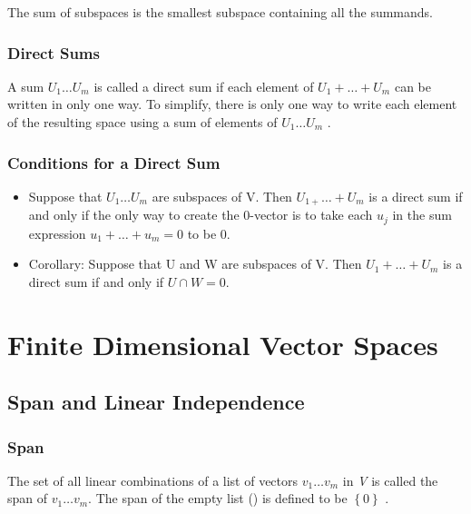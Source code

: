 \documentclass{article}
\begin{document}
The sum of subspaces is the smallest subspace containing all the summands.


\subsubsection{Direct Sums}


A sum \( U_{1} \ldots U_{m}     \) is called a direct sum if each element of \( U_{1} + \ldots + U_{m}     \) can be written in only one way. To simplify, there is only one way to write each element of the resulting space using a sum of elements of \( U_{1} \ldots U_{m}     \) .


\subsubsection{Conditions for a Direct Sum}


\begin{itemize}

\item Suppose that \( U_{1} \ldots U_{m}     \) are subspaces of V. Then \( U_{1 +} \ldots + U_{m}     \) is  a direct sum if and only if the only way to create the 0-vector is to take each \( u_{j} \) in the sum expression \( u_{1} + \ldots + u_{m} = 0   \) to be 0.


\item Corollary: Suppose that U and W are subspaces of V. Then \( U_{1} +\ldots + U_{m}     \) is a direct sum if and only if \( U \cap W = { 0 } \).

\end{itemize}





\section{Finite Dimensional Vector Spaces}

\subsection{Span and Linear Independence}
\subsubsection{Span}
The set of all linear combinations of a list of vectors \( v_{1}
\ldots v_{m} \) in \textit{V} is called the span of \( v_{1} \ldots v_{m} \).  The span of the empty list () is defined to be \(  \left \{ 0 \right \} \) .
\end{document}
